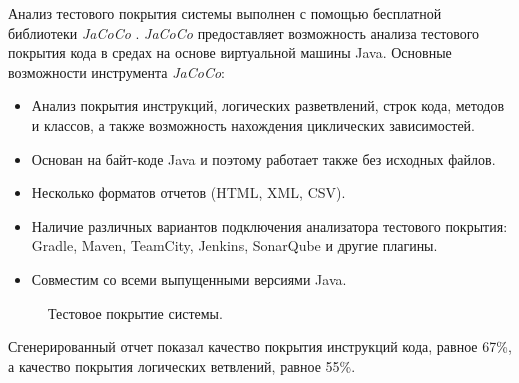 \documentclass[a4paper,14pt]{extreport} %
\begin{document}
Анализ тестового покрытия системы выполнен с помощью бесплатной библиотеки \textit{JaCoCo} \cite{TEST_COVERAGE_LIB}. \textit{JaCoCo} предоставляет возможность анализа тестового покрытия кода в средах на основе виртуальной машины Java.
Основные возможности инструмента \textit{JaCoCo}:
\begin{itemize}
\item Анализ покрытия инструкций, логических разветвлений, строк кода, методов и классов, а также возможность нахождения циклических зависимостей.
\item Основан на байт-коде Java и поэтому работает также без исходных файлов.
\item Несколько форматов отчетов (HTML, XML, CSV).
\item Наличие различных вариантов подключения анализатора тестового покрытия: Gradle, Maven, TeamCity, Jenkins, SonarQube и другие  плагины.
\item Совместим со всеми выпущенными версиями Java.
\end{itemize}

\begin{figure}[H]
\caption{Тестовое покрытие системы.}
\label{test-coverage}
\end{figure}

Сгенерированный отчет показал качество покрытия инструкций кода, равное 67\%, а качество покрытия логических ветвлений, равное 55\%.
\end{document}
